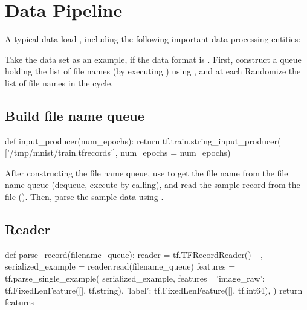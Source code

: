 \section{Data Pipeline}
\begin{content}
A typical data load , including the following important data processing entities:

\begin{enum}
\end{enum}

Take the  data set as an example, if the data format is . First, construct a  queue holding the list of file names (by executing ) using , and at each  Randomize the list of file names in the cycle.


\subsection{Build file name queue}

\begin{leftbar}
\begin{python}
def input_producer(num_epochs):
  return tf.train.string_input_producer(
    ['/tmp/mnist/train.tfrecords'], num_epochs = num_epochs)
\end{python}
\end{leftbar}

After constructing the file name queue, use  to get the file name from the file name queue (dequeue, execute  by calling), and read the sample record from the file (). Then, parse the sample data using .


\subsection{Reader}

\begin{leftbar}
\begin{python}
def parse_record(filename_queue):
  reader = tf.TFRecordReader()
  _, serialized_example = reader.read(filename_queue)
  features = tf.parse_single_example(
      serialized_example,
      features={
          'image_raw': tf.FixedLenFeature([], tf.string),
          'label': tf.FixedLenFeature([], tf.int64),
      })
  return features
\end{python}
\end{leftbar}



\end{content}
